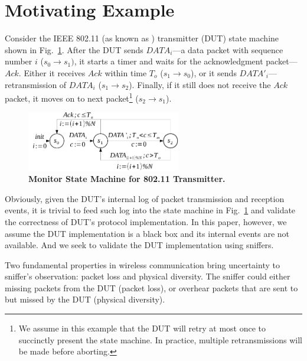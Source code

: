 \section{Motivating Example}
\label{sec:motivation}

Consider the IEEE 802.11 (as known as \wifi{}) transmitter (DUT) state machine
shown in Fig.~\ref{fig:dot11_tx_ta}. After the DUT sends $DATA_i$---a data
packet with sequence number $i$ ($s_0\rightarrow s_1)$, it starts a timer and
waits for the acknowledgment packet---$Ack$. Either it receives $Ack$ within time
$T_o$ ($s_1\rightarrow s_0$), or it sends $DATA'_i$---retransmission of $DATA_i$
($s_1\rightarrow s_2$). Finally, if it still does not receive the $Ack$ packet,
it moves on to next packet\footnote{We assume in this example that the DUT will
retry at most once to succinctly present the state machine.  In practice,
multiple retransmissions will be made before aborting.} ($s_2\rightarrow s_1$).

\begin{figure}
  \vspace*{-6mm}
  \centering
  \includegraphics[width=0.6\textwidth]{./figures/dot11_tx_ta.pdf}
  \caption{\textbf{Monitor State Machine for 802.11 Transmitter.}}
  \label{fig:dot11_tx_ta}
  \vspace*{-5mm}
\end{figure}


Obviously, given the DUT's internal log of packet transmission and reception
events, it is trivial to feed such log into the state machine in
Fig.~\ref{fig:dot11_tx_ta} and validate the correctness of DUT's protocol
implementation. In this paper, however, we assume the DUT implementation is a
black box and its internal events are not available. And we seek to validate the
DUT implementation using sniffers.

Two fundamental properties in wireless communication bring uncertainty
to sniffer's observation: packet loss and physical diversity. The sniffer could
either missing packets from the DUT (packet loss), or overhear packets that are
sent to but missed by the DUT (physical diversity).

